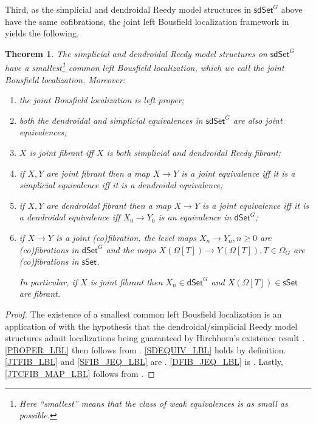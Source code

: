 \documentclass[a4paper,10pt
,draft
]{article}%
\numberwithin{equation}{section}
\numberwithin{figure}{section}
\newtheorem{theorem}[equation]{Theorem}%
\theoremstyle{definition} %
\newcommand{\sSet}{\ensuremath{\mathsf{sSet}}}%
\newcommand{\dSet}{\mathsf{dSet}}
\newcommand{\1}{\ensuremath{\mathbbm 1}}%
\begin{document}
Third, as the simplicial and dendroidal Reedy model structures
in $\mathsf{sdSet}^G$ above have the same cofibrations,
the joint left Bousfield localization framework in 
\cite[\S 4.1]{BP_edss}
yields the following.


\begin{theorem}\label{JB_THM}
	The simplicial and dendroidal Reedy model structures on 
	$\mathsf{sdSet}^G$
	have a smallest\footnote{Here ``smallest'' means that the class of weak equivalences is as small as possible.}
	common left Bousfield localization,
	which we call the \emph{joint Bousfield localization}.
	Moreover:
\begin{enumerate}[label = (\roman*)]
	\item \label{PROPER_LBL}
	the joint Bousfield localization is left proper;
	\item \label{SDEQUIV_LBL}
	both the dendroidal and simplicial equivalences in $\mathsf{sdSet}^G$ are also joint equivalences;
	\item \label{JTFIB_LBL}
	$X$ is joint fibrant iff $X$ is both simplicial and dendroidal Reedy fibrant;
	\item \label{SFIB_JEQ_LBL} if $X,Y$ are joint fibrant
	then a map $X \to Y$ is a joint equivalence iff it is a simplicial
	equivalence iff it is a dendroidal equivalence;
	\item \label{DFIB_JEQ_LBL} if $X,Y$ are dendroidal fibrant
	then a map $X \to Y$ is a joint equivalence iff 
	it is a dendroidal equivalence iff $X_0 \to Y_0$ is an equivalence in $\mathsf{dSet}^G$;
	\item \label{JTCFIB_MAP_LBL} 
	if $X \to Y$ is a joint (co)fibration,
	the level maps 
	$X_n \to Y_n, n \geq 0$
	are (co)fibrations in $\mathsf{dSet}^G$
	and the maps
	$X\left(\Omega[T]\right) \to Y\left(\Omega[T]\right), T \in \Omega_G$
	are (co)fibrations in $\mathsf{sSet}$.

	In particular, if 
	$X$ is joint fibrant
	then $X_n \in \dSet^G$ and $X(\Omega[T]) \in \sSet$ are fibrant.
\end{enumerate}
\end{theorem}



\begin{proof}
	The existence of a smallest common left Bousfield localization is 
	an application of \cite[Prop. 4.1]{BP_edss}
	with the hypothesis that the dendroidal/simplicial Reedy model structures admit localizations being guaranteed by 
	Hirchhorn's existence result 
	\cite[Thm. 4.1.1]{Hir03}.
	\ref{PROPER_LBL} then follows from \cite[Thm. 4.1.1(3)]{Hir03}.
	\ref{SDEQUIV_LBL} holds by definition.
	\ref{JTFIB_LBL} and \ref{SFIB_JEQ_LBL} are \cite[Prop. 4.1(i)(ii)]{BP_edss}.
	\ref{DFIB_JEQ_LBL} is \cite[Cor. 4.29(iii)]{BP_edss}.
	Lastly, \ref{JTCFIB_MAP_LBL} follows from \cite[Lemmas A.27(i), A.29(i)]{BP_edss}.
\end{proof}
\end{document}
